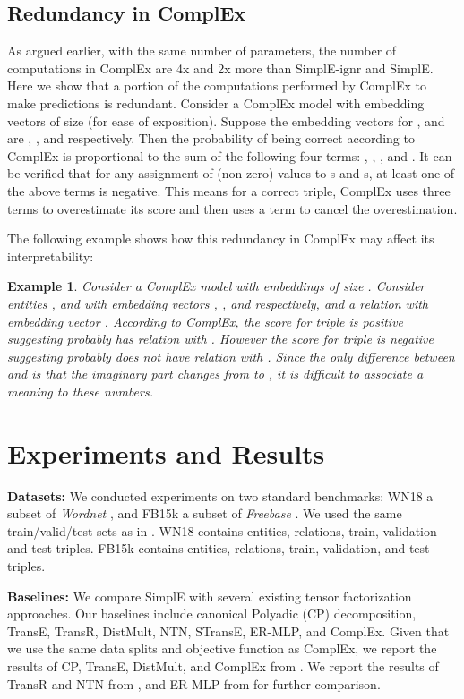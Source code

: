 \documentclass{article}
\newtheorem{exampl}{Example}
\newenvironment{example}{\begin{exampl}\em}{\end{exampl}}
\begin{document}
\subsection{Redundancy in ComplEx}
As argued earlier, with the same number of parameters, the number of computations in ComplEx are 4x and 2x more than SimplE-ignr and SimplE. Here we show that a portion of the computations performed by ComplEx to make predictions is redundant. Consider a ComplEx model with embedding vectors of size  (for ease of exposition). Suppose the embedding vectors for ,  and  are , , and  respectively. Then the probability of  being correct according to ComplEx is proportional to the sum of the following four terms: , , , and .
It can be verified that for any assignment of (non-zero) values to s and s, at least one of the above terms is negative. 
This means for a correct triple, ComplEx uses three terms to overestimate its score and then uses a term to cancel the overestimation.

The following example shows how this redundancy in ComplEx may affect its interpretability:
\begin{example}
Consider a ComplEx model with embeddings of size . Consider entities ,  and  with embedding vectors , , and  respectively, and a relation  with embedding vector .
According to ComplEx, the score for triple  is positive suggesting  probably has relation  with . However the score for triple  is negative suggesting  probably does not have relation  with . Since the only difference between  and  is that the imaginary part changes from  to , it is difficult to associate a meaning to these numbers.
\end{example}

\section{Experiments and Results}
\textbf{Datasets:} We conducted experiments on two standard benchmarks: WN18 a subset of \emph{Wordnet} \cite{miller1995wordnet}, and FB15k a subset of \emph{Freebase} \cite{bollacker2008freebase}. We used the same train/valid/test sets as in \cite{bordes2013translating}. WN18 contains  entities,  relations,  train,  validation and  test triples. FB15k contains  entities,  relations,  train,  validation, and  test triples.

\textbf{Baselines:} We compare SimplE with several existing tensor factorization approaches. Our baselines include canonical Polyadic (CP) decomposition, TransE, TransR,  DistMult, NTN, STransE, ER-MLP, and ComplEx. Given that we use the same data splits and objective function as ComplEx, we report the results of CP, TransE, DistMult, and ComplEx from \cite{trouillon2016complex}. We report the results of TransR and NTN from \cite{nguyen2017overview}, and ER-MLP from \cite{nickel2016holographic} for further comparison.
\end{document}

